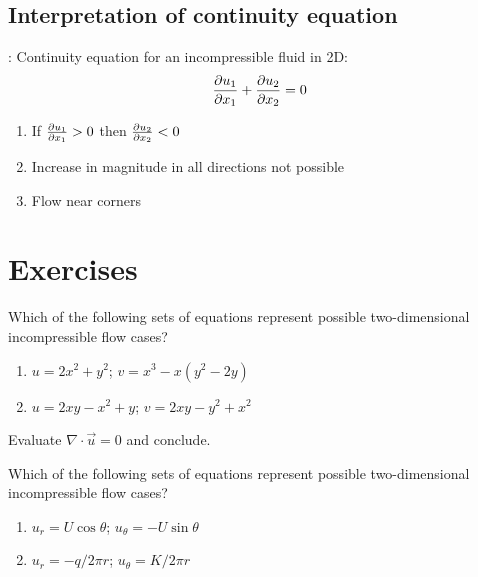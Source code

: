 \subsection{Interpretation of continuity equation}:
Continuity equation for an incompressible fluid in 2D:
$$ {\partial u_1 \over \partial x_1} + {\partial u_2 \over \partial x_2} = 0 $$
\begin{enumerate}
\item If ${\partial u_1 \over \partial x_1} > 0$ then ${\partial u_2 \over \partial x_2} < 0$
\item Increase in magnitude in all directions not possible
\item Flow near corners
\end{enumerate}


\section{Exercises}

\begin{question}
\item Which of the following sets of equations represent possible two-dimensional incompressible flow cases?
\begin{enumerate}
	\item $u=2x^2+y^2$; $v=x^3-x(y^2-2y)$
	\item $u=2xy-x^2+y$; $v=2xy-y^2+x^2$
\end{enumerate}
\end{question}
\begin{solution}[print]
Evaluate $\nabla \cdot \vec{u} = 0$ and conclude. 
\end{solution}


\begin{question}
\item Which of the following sets of equations represent possible two-dimensional incompressible flow cases?

\begin{enumerate}
\item $u_r=U\cos\theta$; $u_\theta=-U\sin\theta$
\item $u_r={-q / 2\pi r}$; $u_\theta={K/2\pi r}$
\end{enumerate}
\end{question}
\begin{solution}[print]
\end{solution}

